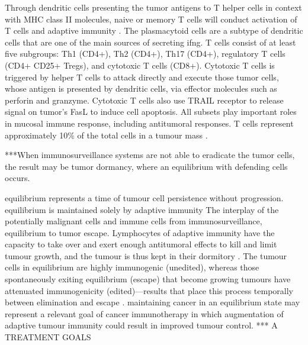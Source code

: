 \documentclass[12pt, a4paper]{article}
\begin{document}
Through dendritic cells presenting the tumor antigens to T helper cells in context with MHC class II molecules, naive or memory T cells will conduct activation of  T cells and adaptive immunity \citep{Banchereau2000}. 
The plasmacytoid cells are a subtype of dendritic cells that are one of the main sources of secreting \acrshort{ifng}. 
T cells consist of at least five subgroups: Th1 (CD4+), Th2 (CD4+), Th17 (CD4+), regulatory T cells (CD4+ CD25+ Tregs), and cytotoxic T cells (CD8+). 
Cytotoxic T cells is triggered by helper T cells to attack directly and execute those tumor cells, whose antigen is presented by dendritic cells, via effector molecules such as perforin and granzyme. Cytotoxic T cells also use TRAIL receptor to release signal on tumor's FasL to induce cell apoptosis.
All subsets play important roles in mucosal immune response, including antitumoral responses. T cells represent approximately 10\% of the total cells in a tumour mass \citep{Balkwill2012}.

***When immunosurveillance systems are not able to eradicate the tumor cells, the result may be tumor dormancy, where an equilibrium with defending cells occurs.

equilibrium represents a time of tumour cell persistence without progression.
equilibrium is maintained solely by adaptive immunity
The interplay of the potentially malignant cells and immune cells from immunosurveillance, equilibrium to tumor escape.
Lymphocytes of adaptive immunity have the capacity to take over and exert enough antitumoral effects to kill and limit tumour growth, and the tumour is thus kept in their dormitory \citep{Koebel2007}.
The tumour cells in equilibrium are highly immunogenic (unedited), whereas those spontaneously exiting equilibrium (escape) that become growing tumours have attenuated immunogenicity (edited)—results that place this process temporally between elimination and escape \citep{Koebel2007}.
maintaining cancer in an equilibrium state may represent a relevant goal of cancer immunotherapy in which augmentation of adaptive tumour immunity could result in improved tumour control. *** A TREATMENT GOALS
\end{document}
